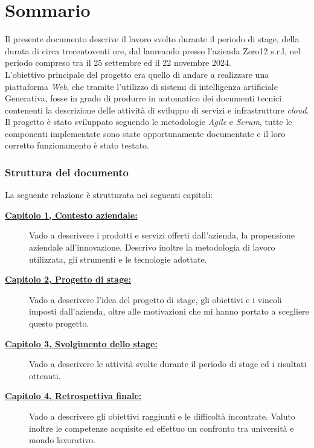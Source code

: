 \cleardoublepage
{}
{}
\begingroup
\let\clearpage\relax
\let\cleardoublepage\relax
\let\cleardoublepage\relax

\chapter*{Sommario}

\small 
Il presente documento descrive il lavoro svolto durante il periodo di stage, della durata di circa trecentoventi ore, dal laureando \myName presso l'azienda Zero12 s.r.l, 
nel periodo compreso tra il 25 settembre ed il 22 novembre 2024. \\
L'obiettivo principale del progetto era quello di andare a realizzare una piattaforma \textit{Web}, che tramite l'utilizzo di sistemi di intelligenza artificiale Generativa, 
fosse in grado di produrre in automatico dei documenti tecnici contenenti la descrizione delle attività di sviluppo di servizi e infrastrutture \textit{cloud}. \\
Il progetto è stato sviluppato seguendo le metodologie \textit{Agile} e \textit{Scrum}, tutte le componenti implementate sono state opportunamente documentate e 
il loro corretto funzionamento è stato testato.\\ 

\subsection*{Struttura del documento}
La seguente relazione è strutturata nei seguenti capitoli:
\begin{description}
    \item[{\hyperref[cap:contesto-aziendale]{\textbf{Capitolo 1, Contesto aziendale:}}}]  Vado a descrivere i prodotti e servizi offerti dall'azienda, la propensione aziendale all'innovazione.
        Descrivo inoltre la metodologia di lavoro utilizzata, gli strumenti e le tecnologie adottate.
    \item[{\hyperref[cap:introduzione-al-progetto]{\textbf{Capitolo 2, Progetto di stage:}}}] Vado a descrivere l'idea del progetto di stage, gli obiettivi e i vincoli imposti dall'azienda, oltre alle motivazioni che mi hanno portato a scegliere questo progetto.
    \item[{\hyperref[cap:svolgimento-dello-stage]{\textbf{Capitolo 3, Svolgimento dello stage:}}}] Vado a descrivere le attività svolte durante il periodo di stage ed i risultati ottenuti.
    \item[{\hyperref[cap:retrospettiva-finale]{\textbf{Capitolo 4, Retrospettiva finale:}}}] Vado a descrivere gli obiettivi raggiunti e le difficoltà incontrate.
    Valuto inoltre le competenze acquisite ed effettuo un confronto tra università e mondo lavorativo.
\end{description}

